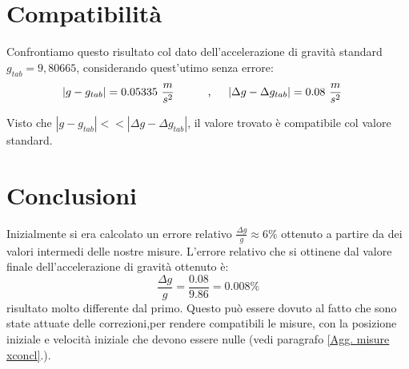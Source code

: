 \documentclass[12pt, a4paper]{article}
\begin{document}
\section{Compatibilità}
Confrontiamo questo risultato col dato dell'accelerazione di gravità standard $g_{tab}=9,80665$, considerando quest'utimo senza errore:
\begin{equation*}
\begin{aligned}
  & |g-g_{tab}|=0.05335 \ \frac{m}{s^2}
  &\quad{} 
  \end{aligned}
  \begin{aligned}
  &&\text{,\phantom{..}}& & 
  |\Delta g-\Delta g_{tab}|=0.08\ \frac{m}{s^2}
  &
  \end{aligned}
\end{equation*}

Visto che $|g-g_{tab}|<< |\Delta g-\Delta g_{tab}|$, il valore trovato è compatibile col valore standard.

\section{Conclusioni}

Inizialmente si era calcolato un errore relativo $\frac{\Delta g}{g}\approx 6\% $ ottenuto a partire da dei valori intermedi delle nostre misure. L'errore relativo che si ottinene dal valore finale dell'accelerazione di gravità ottenuto è:
\begin{equation*}
    \frac{\Delta g}{g}=\frac{0.08}{9.86}=0.008\%
\end{equation*}
risultato molto differente dal primo. Questo può essere dovuto al fatto che sono state attuate delle correzioni,per rendere compatibili le misure, con la posizione iniziale e velocità iniziale che devono essere nulle (vedi paragrafo \ref{Agg. misure xconcl}.). 


\newpage
\end{document}
